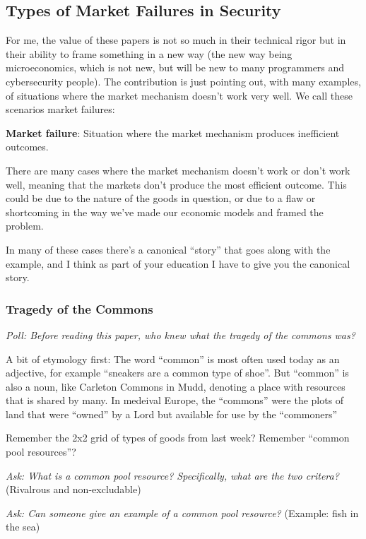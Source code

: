 \documentclass[11pt]{article}
\begin{document}
\subsection{Types of Market Failures in Security}

For me, the value of these papers is not so much in their technical rigor but in their ability to frame something in a new way (the new way being microeconomics, which is not new, but will be new to many programmers and cybersecurity people). The contribution is just pointing out, with many examples, of situations where the market mechanism doesn't work very well. We call these scenarios market failures:

{\bf Market failure}: Situation where the market mechanism produces inefficient outcomes.

There are many cases where the market mechanism doesn't work or don't work well, meaning that the markets don't  produce the most efficient outcome. This could be due to the nature of the goods in question, or due to a flaw or shortcoming in the way we've made our economic models and framed the problem.

In many of these cases there's a canonical ``story'' that goes along with the example, and I think as part of your education I have to give you the canonical story.

\subsubsection{Tragedy of the Commons}

{\it Poll: Before reading this paper, who knew what the tragedy of the commons was?}

A bit of etymology first: The word ``common'' is most often used today as an adjective, for example ``sneakers are a common type of shoe''.
But ``common'' is also a noun, like Carleton Commons in Mudd, denoting a place with resources that is shared by many. In medeival Europe, the ``commons'' were the plots of land that were ``owned'' by a Lord but available for use by the ``commoners''

Remember the 2x2 grid of types of goods from last week? Remember ``common pool resources''?

{\it Ask: What is a common pool resource? Specifically, what are the two critera?} (Rivalrous and non-excludable)

{\it Ask: Can someone give an example of a common pool resource?} (Example: fish in the sea)
\end{document}
